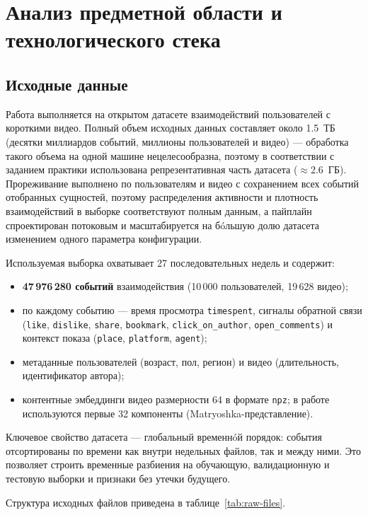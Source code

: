 \section{Анализ предметной области и технологического стека}

\subsection{Исходные данные}

Работа выполняется на открытом датасете взаимодействий пользователей с короткими видео.
Полный объем исходных данных составляет около 1.5~ТБ (десятки миллиардов событий, миллионы пользователей и видео) --- обработка такого объема на одной машине нецелесообразна, поэтому в соответствии с заданием практики использована репрезентативная часть датасета ($\approx$2.6~ГБ).
Прореживание выполнено по пользователям и видео с сохранением всех событий отобранных сущностей, поэтому распределения активности и плотность взаимодействий в выборке соответствуют полным данным, а пайплайн спроектирован потоковым и масштабируется на бóльшую долю датасета изменением одного параметра конфигурации.

Используемая выборка охватывает 27 последовательных недель и содержит:

\begin{itemize}
    \item \textbf{47\,976\,280 событий} взаимодействия (10\,000 пользователей, 19\,628 видео);
    \item по каждому событию --- время просмотра \texttt{timespent}, сигналы обратной связи (\texttt{like}, \texttt{dislike}, \texttt{share}, \texttt{bookmark}, \texttt{click\_on\_author}, \texttt{open\_comments}) и контекст показа (\texttt{place}, \texttt{platform}, \texttt{agent});
    \item метаданные пользователей (возраст, пол, регион) и видео (длительность, идентификатор автора);
    \item контентные эмбеддинги видео размерности 64 в формате \texttt{npz}; в работе используются первые 32 компоненты (Matryoshka-представление).
\end{itemize}

Ключевое свойство датасета --- глобальный временнóй порядок: события отсортированы по времени как внутри недельных файлов, так и между ними.
Это позволяет строить временные разбиения на обучающую, валидационную и тестовую выборки и признаки без утечки будущего.

Структура исходных файлов приведена в таблице~\ref{tab:raw-files}.

